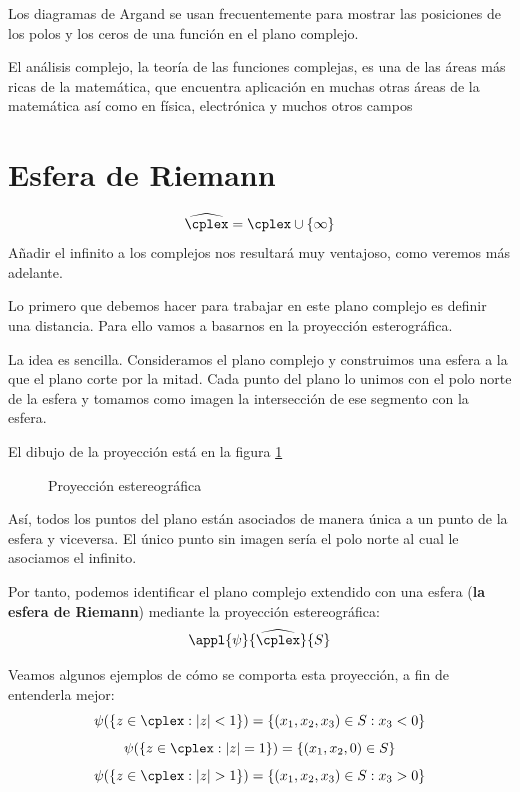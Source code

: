 \documentclass{apuntes}
\begin{document}
Los diagramas de Argand se usan frecuentemente para mostrar las posiciones de los polos y los ceros de una función en el plano complejo.

El análisis complejo, la teoría de las funciones complejas, es una de las áreas más ricas de la matemática, que encuentra aplicación en muchas otras áreas de la matemática así como en física, electrónica y muchos otros campos

\section{Esfera de Riemann}
\begin{defn}
\[\widehat{\cplex}=\cplex \cup \{\infty\}\]
Añadir el infinito a los complejos nos resultará muy ventajoso, como veremos más adelante.
\end{defn}

Lo primero que debemos hacer para trabajar en este plano complejo es definir una distancia. Para ello vamos a basarnos en la proyección esterográfica.

La idea es sencilla. Consideramos el plano complejo y construimos una esfera a la que el plano corte por la mitad. Cada punto del plano lo unimos con el polo norte de la esfera y tomamos como imagen la intersección de ese segmento con la esfera.

El dibujo de la proyección está en la figura \ref{figProyeccionEstereografica}

\begin{figure}[hbtp]
\centering

\caption{Proyección estereográfica}
\label{figProyeccionEstereografica}
\end{figure}

Así, todos los puntos del plano están asociados de manera única a un punto de la esfera y viceversa. El único punto sin imagen sería el polo norte al cual le asociamos el infinito.

Por tanto, podemos identificar el plano complejo extendido con una esfera (\textbf{la esfera de Riemann}) mediante la proyección estereográfica:
\[\appl{\psi}{\widehat{\cplex}}{S}\]

\begin{example}
Veamos algunos ejemplos de cómo se comporta esta proyección, a fin de entenderla mejor:
\[\psi(\{z \in \cplex : |z|<1\})=\{(x_1,x_2,x_3) \in S: x_3<0\}\]
\[\psi(\{z \in \cplex : |z|=1\})=\{(x_1,x_2,0)\in S\}\]
\[\psi(\{z \in \cplex : |z|>1\})=\{(x_1,x_2,x_3) \in S: x_3>0\}\]
\end{example}
\end{document}
